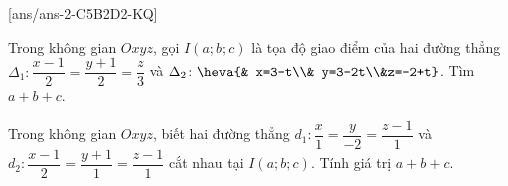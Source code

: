 [ans/ans-2-C5B2D2-KQ]
\TNSA
\begin{ex}%
Trong không gian $Oxyz$, gọi $I(a;b;c)$ là tọa độ giao điểm của hai đường thẳng $\Delta_1 \colon \dfrac{x-1}{2}=\dfrac{y+1}{2}=\dfrac{z}{3}$ và  $\Delta_2 \colon \heva{& x=3-t\\& y=3-2t\\&z=-2+t}$. Tìm $a+b+c$.
\end{ex}
\begin{ex}%
	Trong không gian $Oxyz$, biết hai đường thẳng $d_1 \colon \dfrac{x}{1}=\dfrac{y}{-2}=\dfrac{z-1}{1}$ và  $d_2 \colon \dfrac{x-1}{2}=\dfrac{y+1}{1}=\dfrac{z-1}{1}$ cắt nhau tại $I(a;b;c)$. Tính giá trị $a+b+c$.
\end{ex}

